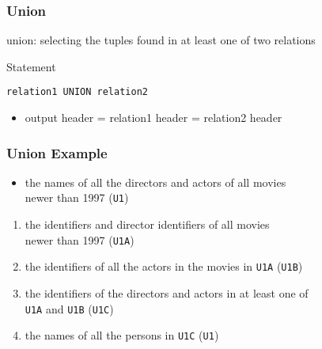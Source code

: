 \documentclass[dvipsnames]{beamer}
\theoremstyle{plain}
\begin{document}
\begin{frame}[fragile]
  \frametitle{Union}

  \begin{definition}
    \alert{union}: selecting the tuples found in at least one of two relations
  \end{definition}

  \pause
  \begin{block}{Statement}
    \begin{lstlisting}
relation1 UNION relation2
    \end{lstlisting}
  \end{block}

  \pause
  \begin{itemize}
    \item output header = relation1 header = relation2 header
  \end{itemize}
\end{frame}

\begin{frame}
  \frametitle{Union Example}

  \begin{example}
    \begin{itemize}
      \item the names of all the directors and actors of all movies\\
        newer than 1997 (\texttt{U1})
    \end{itemize}

    \pause
    \begin{enumerate}
      \item the identifiers and director identifiers of all movies\\
        newer than 1997 (\texttt{U1A})

      \pause
      \item the identifiers of all the actors in the movies in \texttt{U1A}
        (\texttt{U1B})

      \pause
      \item the identifiers of the directors and actors in at least one of\\
        \texttt{U1A} and \texttt{U1B} (\texttt{U1C})

      \pause
      \item the names of all the persons in \texttt{U1C} (\texttt{U1})
    \end{enumerate}
  \end{example}
\end{frame}
\end{document}
